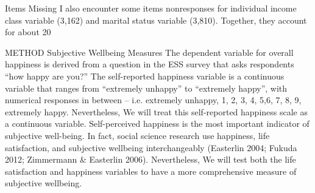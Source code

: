 Items Missing 
I also encounter some items nonresponses for individual income class variable (3,162) and marital status variable (3,810). Together, they account for about 20%

METHOD
Subjective Wellbeing Measures
The dependent variable for overall happiness is derived from a question in the ESS survey that asks respondents “how happy are you?” The self-reported happiness variable is a continuous variable that ranges from “extremely unhappy” to “extremely happy”, with numerical responses in between – i.e. extremely unhappy, 1, 2, 3, 4, 5,6, 7, 8, 9, extremely happy. Nevertheless, We will treat this self-reported happiness scale as a continuous variable. Self-perceived happiness is the most important indicator of subjective well-being. In fact, social science research use happiness, life satisfaction, and subjective wellbeing interchangeably (Easterlin 2004; Fukuda 2012; Zimmermann & Easterlin 2006). Nevertheless, We will test both the life satisfaction and happiness variables to have a more comprehensive measure of subjective wellbeing.

